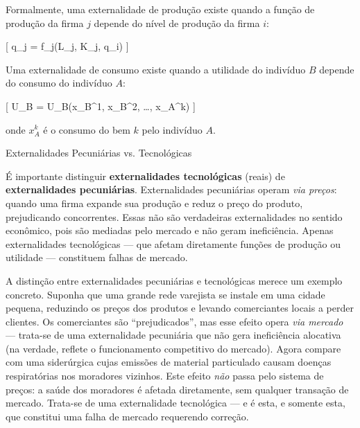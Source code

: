 \documentclass[11pt,twoside,openright]{book}
\begin{document}
Formalmente, uma externalidade de produção existe quando a função de
produção da firma \(j\) depende do nível de produção da firma \(i\):

{[} q\_j = f\_j(L\_j, K\_j, q\_i) \label{eq:20.1}  {]}

Uma externalidade de consumo existe quando a utilidade do indivíduo
\(B\) depende do consumo do indivíduo \(A\):

{[} U\_B = U\_B(x\_B\^{}1, x\_B\^{}2, \ldots, x\_A\^{}k) \label{eq:20.2}
 {]}

onde \(x_A^k\) é o consumo do bem \(k\) pelo indivíduo \(A\).

\begin{notebox}{Externalidades Pecuniárias vs. Tecnológicas}

É importante distinguir \textbf{externalidades tecnológicas} (reais) de
\textbf{externalidades pecuniárias}. Externalidades pecuniárias operam
\emph{via preços}: quando uma firma expande sua produção e reduz o preço
do produto, prejudicando concorrentes. Essas não são verdadeiras
externalidades no sentido econômico, pois são mediadas pelo mercado e
não geram ineficiência. Apenas externalidades tecnológicas --- que
afetam diretamente funções de produção ou utilidade --- constituem
falhas de mercado.

\end{notebox}

A distinção entre externalidades pecuniárias e tecnológicas merece um
exemplo concreto. Suponha que uma grande rede varejista se instale em
uma cidade pequena, reduzindo os preços dos produtos e levando
comerciantes locais a perder clientes. Os comerciantes são
``prejudicados'', mas esse efeito opera \emph{via mercado} --- trata-se
de uma externalidade pecuniária que não gera ineficiência alocativa (na
verdade, reflete o funcionamento competitivo do mercado). Agora compare
com uma siderúrgica cujas emissões de material particulado causam
doenças respiratórias nos moradores vizinhos. Este efeito \emph{não}
passa pelo sistema de preços: a saúde dos moradores é afetada
diretamente, sem qualquer transação de mercado. Trata-se de uma
externalidade tecnológica --- e é esta, e somente esta, que constitui
uma falha de mercado requerendo correção.
\end{document}
